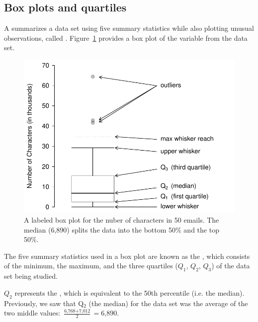 \subsection{Box plots and quartiles}

A  summarizes a data set using five summary statistics while also plotting unusual observations, called . Figure~\ref{boxPlotLayoutNumVar} provides a box plot of the  variable from the  data set.

\begin{figure}
   \centering
   \includegraphics[width=0.9\mycaptionwidth]{ch_summarizing_data/figures/boxPlotLayoutNumVar/boxPlotLayoutNumVar}
\caption{A labeled box plot for the nuber of characters in 50 emails. The median (6,890) splits the data into the bottom 50\% and the top 50\%.}
   \label{boxPlotLayoutNumVar}
\end{figure}

The five summary statistics used in a box plot are known as the , which consists of the minimum, the maximum, and the three quartiles ($Q_1$, $Q_2$, $Q_3$) of the data set being studied.

$Q_2$ represents the , which is equivalent to the 50th percentile (i.e. the median). Previously, we saw that Q$_2$ (the median) for the  data set was the average of the two middle values: $\frac{\text{6,768} + \text{7,012}}{2} = \text{6,890}$.

